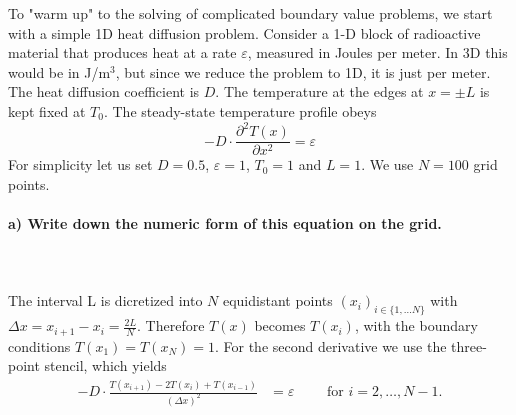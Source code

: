 To "warm up" to the solving of complicated boundary value problems, we
start with a simple 1D heat diffusion problem. Consider a 1-D block of
radioactive material that produces heat at a rate $\varepsilon$,
measured in Joules per meter. In 3D this would be in J/m$^3$, but
since we reduce the problem to 1D, it is just per meter. The heat
diffusion coefficient is $D$. The temperature at the edges at $x=\pm L$
is kept fixed at $T_0$. The steady-state temperature profile obeys
\begin{equation}
    -D\cdot\frac{\partial^2T(x)}{\partial x^2}=\varepsilon
    \label{eq:temp_diffusion_equation}
\end{equation}
For simplicity let us set $D=0.5$, $\varepsilon=1$, $T_0=1$ and $L=1$.
We use $N=100$ grid points.

\paragraph{
    a) Write down the numeric form of this equation on the grid.
} \ \\
    \\
    The interval L is dicretized into $N$ equidistant points
    $(x_i)_{i \in \{1, \dots N\}}$ with
    $\Delta x = x_{i+1}-x_i = \frac{2L}{N}$. Therefore $T(x)$
    becomes $T(x_i)$, with the boundary conditions
    $T(x_1)=T(x_N)=1$. For the second derivative we use the
    three-point stencil, which yields
    \begin{align}
        -D\cdot\frac{T(x_{i+1}) - 2 T(x_i) + T(x_{i-1})}
        {(\Delta x)^2}&=\varepsilon \qquad \text{ for }i=2,
        \dots, N-1.
    \end{align}

